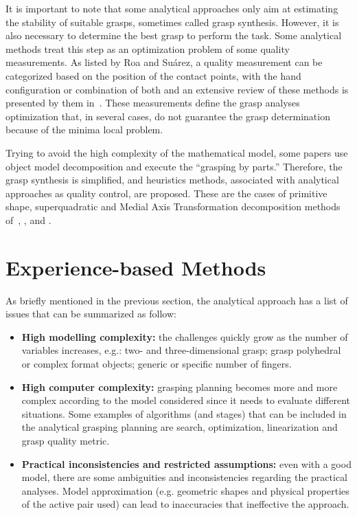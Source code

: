 It is important to note that some analytical approaches only aim at estimating the stability of suitable grasps, sometimes called grasp synthesis. However, it is also necessary to determine the best grasp to perform the task. Some analytical methods treat this step as an optimization problem of some quality measurements. As listed by Roa and Suárez, a quality measurement can be categorized based on the position of the contact points, with the hand configuration or combination of both and an extensive review of these methods is presented by them in~\cite{roa2015grasp}. These measurements define the grasp analyses optimization that, in several cases, do not guarantee the grasp determination because of the minima local problem.

Trying to avoid the high complexity of the mathematical model, some papers use object model decomposition and execute the “grasping by parts.” Therefore, the grasp synthesis is simplified, and heuristics methods, associated with analytical approaches as quality control, are proposed. These are the cases of primitive shape, superquadratic and Medial Axis Transformation decomposition methods of~\cite{miller2003automatic}, \cite{goldfeder2007grasp}, and  \cite{przybylski2011planning}.


\section{Experience-based Methods}
\label{sec:soa_exp_based_methods}

As briefly mentioned in the previous section, the analytical approach has a list of issues that can be summarized as follow:

\begin{itemize}
    \item	\textbf{High modelling complexity:} the challenges quickly grow as the number of variables increases, e.g.: two- and three-dimensional grasp; grasp polyhedral or complex format objects; generic or specific number of fingers.
    
    \item	\textbf{High computer complexity:} grasping planning becomes more and more complex according to the model considered since it needs to evaluate different situations. Some examples of algorithms (and stages) that can be included in the analytical grasping planning are search, optimization, linearization and grasp quality metric.
    
    \item \textbf{Practical inconsistencies and restricted assumptions:} even with a good model, there are some ambiguities and inconsistencies regarding the practical analyses. Model approximation (e.g. geometric shapes and physical properties of the active pair used) can lead to inaccuracies that ineffective the approach.
\end{itemize}


